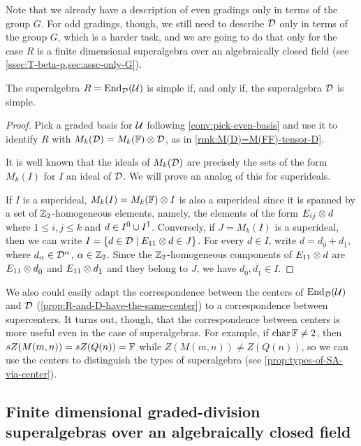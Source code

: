 Note that we already have a description of even gradings only in terms of the group $G$. 
For odd gradings, though, we still need to describe $\mathcal{D}$ only in terms of the group $G$, which is a harder task, and we are going to do that only for the case $R$ is a finite dimensional superalgebra over an algebraically closed field (see \cref{ssec:T-beta-p,sec:assc-only-G}).
 
\begin{prop}\label{prop:simple-R-D-super}
	The superalgebra $R = \operatorname{End}_{\mathcal{D}} (\mathcal U)$ is simple if, and only if, the superalgebra $\mathcal{D}$ is simple.
\end{prop}

\begin{proof}
    Pick a graded basis for $\mathcal U$ following \cref{conv:pick-even-basis} and use it to identify $R$ with $M_k(\mathcal{D}) = M_k(\mathbb{F}) \otimes \mathcal{D}$, as in \cref{rmk:M(D)=M(FF)-tensor-D}.

	It is well known that the ideals of $M_k(\mathcal{D})$ are precisely the sets of the form $M_k(I)$ for $I$ an ideal of $\mathcal{D}$.
	We will prove an analog of this for superideals.

	If $I$ is a superideal, $M_k(I) = M_k(\mathbb{F}) \otimes I$ is also a superideal since it is spanned by a set of $\mathbb{Z}_2$-homogeneous elements, namely, the elements of the form $E_{ij}\otimes d$ where $1 \leq i,j \leq k$ and $d \in I^{\bar0} \cup I^{\bar1}$.
	Conversely, if $J = M_k(I)$ is a superideal, then we can write $I = \{ d\in  \mathcal{D} \mid E_{11}\otimes d \in J\}$.
	For every $d\in I$, write $d = d_{\bar 0} + d_{\bar 1}$, where $d_\alpha \in \mathcal{D}^\alpha$, $\alpha \in \mathbb{Z}_2$.
	Since the $\mathbb{Z}_2$-homogeneous components of $E_{11}\otimes d$ are $E_{11}\otimes d_{\bar 0}$ and $E_{11}\otimes d_{\bar 1}$ and they belong to $J$, we have $d_{\bar 0}, d_{\bar 1} \in I$.
\end{proof}

We also could easily adapt the correspondence between the centers of $\operatorname{End}_{\mathcal{D}} (\mathcal U)$ and $\mathcal{D}$ (\cref{prop:R-and-D-have-the-same-center}) to a correspondence between supercenters. 
It turns out, though, that the correspondence between centers is more useful even in the case of superalgebras. 
For example, if $\operatorname{char} \mathbb{F} \neq 2$, then $sZ(M(m,n)) = sZ(Q(n)) = \mathbb{F}$ while $Z(M(m,n)) \neq Z(Q(n))$, so we can use the centers to distinguish the types of superalgebra (see \cref{prop:types-of-SA-via-center}). 

\subsection{Finite dimensional graded-division superalgebras over an algebraically closed field}\label{ssec:T-beta-p}

